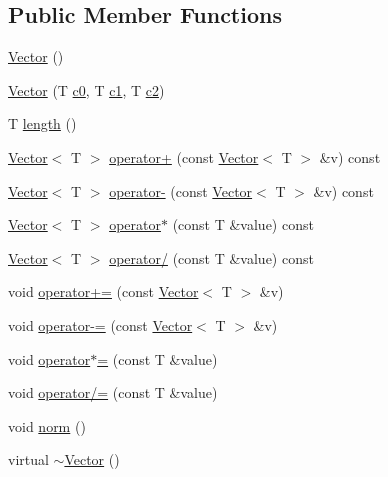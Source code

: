 \subsection*{Public Member Functions}
\begin{DoxyCompactItemize}
\item 
\hyperlink{classccmc_1_1_vector_af4225e7206c28bacb630cb396c64be26}{Vector} ()
\item 
\hyperlink{classccmc_1_1_vector_a02455eac25051ae838ad4e95e7216714}{Vector} (T \hyperlink{classccmc_1_1_point_a89fbc3792873bbc1b35d205fc0b56112}{c0}, T \hyperlink{classccmc_1_1_point_af305f62b5b3830dfb9659ba05fa8730b}{c1}, T \hyperlink{classccmc_1_1_point_aca8161451d99e44ad32f735265273db6}{c2})
\item 
T \hyperlink{classccmc_1_1_vector_a9e0862cc9c8815c93f956ccc9e23fd2f}{length} ()
\item 
\hyperlink{classccmc_1_1_vector}{Vector}$<$ T $>$ \hyperlink{classccmc_1_1_vector_ac5a7a3e1ffd4cc9882cb0ce128b930dc}{operator+} (const \hyperlink{classccmc_1_1_vector}{Vector}$<$ T $>$ \&v) const 
\item 
\hyperlink{classccmc_1_1_vector}{Vector}$<$ T $>$ \hyperlink{classccmc_1_1_vector_acb0072a220f2406fda8e11110e5510a8}{operator-\/} (const \hyperlink{classccmc_1_1_vector}{Vector}$<$ T $>$ \&v) const 
\item 
\hyperlink{classccmc_1_1_vector}{Vector}$<$ T $>$ \hyperlink{classccmc_1_1_vector_a2491906184df8122fcda96007bac5115}{operator$\ast$} (const T \&value) const 
\item 
\hyperlink{classccmc_1_1_vector}{Vector}$<$ T $>$ \hyperlink{classccmc_1_1_vector_a6d9500d4acc11e7d0aa2933627019682}{operator/} (const T \&value) const 
\item 
void \hyperlink{classccmc_1_1_vector_ad0d3a9cad19ad25cf13172cececeaab7}{operator+=} (const \hyperlink{classccmc_1_1_vector}{Vector}$<$ T $>$ \&v)
\item 
void \hyperlink{classccmc_1_1_vector_a87cc4b013e4f5ba0c7d493f665872c5b}{operator-\/=} (const \hyperlink{classccmc_1_1_vector}{Vector}$<$ T $>$ \&v)
\item 
void \hyperlink{classccmc_1_1_vector_a77f6a462e3ee95966ea46b6166becd2e}{operator$\ast$=} (const T \&value)
\item 
void \hyperlink{classccmc_1_1_vector_a4931c0a54c45345ce78500fe9dd07979}{operator/=} (const T \&value)
\item 
void \hyperlink{classccmc_1_1_vector_a636dc16795ca8a91b93a7aa54c483f0f}{norm} ()
\item 
virtual \hyperlink{classccmc_1_1_vector_a4ebb935d3f42494678f37eda85a06c1a}{$\sim$\-Vector} ()
\end{DoxyCompactItemize}
